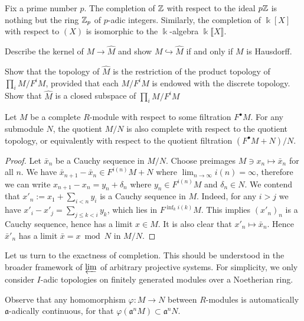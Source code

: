\begin{example}
	Fix a prime number $p$. The completion of $\mathbb{Z}$ with respect to the ideal $p\mathbb{Z}$ is nothing but the ring $\mathbb{Z}_p$ of $p$-adic integers. Similarly, the completion of $\Bbbk[X]$ with respect to $(X)$ is isomorphic to the $\Bbbk$-algebra $\Bbbk\llbracket X\rrbracket$.
\end{example}

\begin{exercise}
	Describe the kernel of $M \to \hat{M}$ and show $M \hookrightarrow \hat{M}$ if and only if $M$ is Hausdorff.
\end{exercise}

\begin{exercise}
	Show that the topology of $\hat{M}$ is the restriction of the product topology of $\prod_i M/F^i M$, provided that each $M/F^i M$ is endowed with the discrete topology. Show that $\hat{M}$ is a closed subspace of $\prod_i M/F^i M$
\end{exercise}

\begin{lemma}\label{prop:quotient-completion}
	Let $M$ be a complete $R$-module with respect to some filtration $F^\bullet M$. For any submodule $N$, the quotient $M/N$ is also complete with respect to the quotient topology, or equivalently with respect to the quotient filtration $(F^\bullet M + N)/N$.
\end{lemma}
\begin{proof}
	Let $\bar{x}_n$ be a Cauchy sequence in $M/N$. Choose preimages $M \ni x_n \mapsto \bar{x}_n$ for all $n$. We have $\bar{x}_{n+1} - \bar{x}_n \in F^{i(n)}M + N$ where $\lim_{n \to \infty} i(n) = \infty$, therefore we can write $x_{n+1} - x_n = y_n + \delta_n$ where $y_n \in F^{i(n)} M$ and $\delta_n \in N$. We contend that $x'_n := x_1 + \sum_{i < n} y_i$ is a Cauchy sequence in $M$. Indeed, for any $i > j$ we have $x'_i - x'_j = \sum_{j \leq k < i} y_k$, which lies in $F^{\inf_k i(k)} M$. This implies $(x'_n)_n$ is a Cauchy sequence, hence has a limit $x \in M$. It is also clear that $x'_n \mapsto \bar{x}_n$. Hence $\bar{x}'_n$ has a limit $\bar{x} = x \bmod N$ in $M/N$.
\end{proof}

Let us turn to the exactness of completion. This should be understood in the broader framework of $\varprojlim$ of arbitrary projective systems. For simplicity, we only consider $I$-adic topologies on finitely generated modules over a Noetherian ring.

Observe that any homomorphism $\varphi: M \to N$ between $R$-modules is automatically $\mathfrak{a}$-adically continuous, for that $\varphi(\mathfrak{a}^n M) \subset \mathfrak{a}^n N$.

